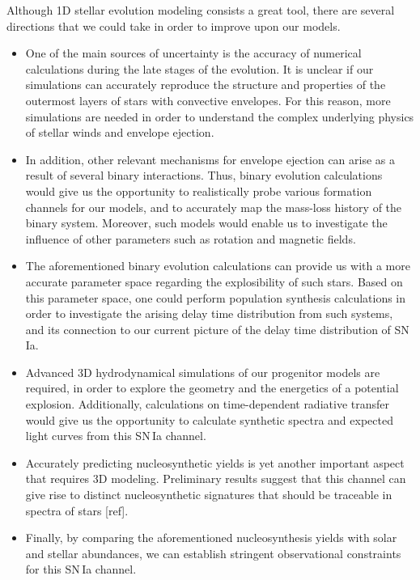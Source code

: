 \documentclass[../../main/thesis_msc.tex]{subfiles}
\begin{document}
		
		Although 1D stellar evolution modeling consists a great tool, there are several directions that we could take in order to improve upon our models.
		\begin{itemize}
			\item One of the main sources of uncertainty is the accuracy of numerical calculations during the late stages of the evolution. It is unclear if our simulations can accurately reproduce the structure and properties of the outermost layers of stars with convective envelopes. For this reason, more simulations are needed in order to understand the complex underlying physics of stellar winds and envelope ejection.
			
			\item In addition, other relevant mechanisms for envelope ejection can arise as a result of several binary interactions. Thus, binary evolution calculations would give us the opportunity to realistically probe various formation channels for our models, and to accurately map the mass-loss history of the binary system. Moreover, such models would enable us to investigate the influence of other parameters such as rotation and magnetic fields.
			
			\item  The aforementioned binary evolution calculations can provide us with a more accurate parameter space regarding the explosibility of such stars. Based on this parameter space, one could perform population synthesis calculations in order to investigate the arising delay time distribution from such systems, and its connection to our current picture of the delay time distribution of SN\,Ia.
			
			\item Advanced 3D hydrodynamical simulations of our progenitor models are required, in order to explore the geometry and the energetics of a potential explosion. Additionally, calculations on time-dependent radiative transfer would give us the opportunity to calculate synthetic spectra and expected light curves from this SN\,Ia channel.
			
			\item Accurately predicting nucleosynthetic yields is yet another important aspect that requires 3D modeling. Preliminary results suggest that this channel can give rise to distinct nucleosynthetic signatures that should be traceable in spectra of stars [ref].
			
			\item Finally, by comparing the aforementioned nucleosynthesis yields with solar and stellar abundances, we can establish stringent observational constraints for this SN\,Ia channel.
			
		
		\end{itemize}
		

		
\end{document}
